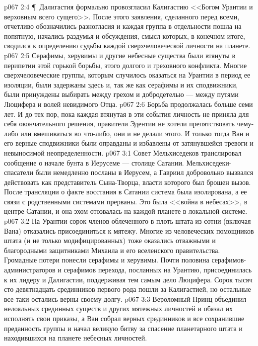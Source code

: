 \vs p067 2:4 \P\ Далигастия формально провозгласил Калигастию <<Богом Урантии и верховным всего сущего>>. После этого заявления, сделанного перед всеми, отчетливо обозначились разногласия и каждая группа в отдельности пошла на попятную, начались раздумья и обсуждения, смысл которых, в конечном итоге, сводился к определению судьбы каждой сверхчеловеческой личности на планете.
\vs p067 2:5 Серафимы, херувимы и другие небесные существа были втянуты в перипетии этой горькой борьбы, этого долгого и греховного конфликта. Многие сверхчеловеческие группы, которым случилось оказаться на Урантии в период ее изоляции, были задержаны здесь и, так же как серафимы и их сподвижники, были принуждены выбирать между грехом и добродетелью --- между путями Люцифера и волей невидимого Отца.
\vs p067 2:6 Борьба продолжалась больше семи лет. И до тех пор, пока каждая втянутая в эти события личность не приняла для себя окончательного решения, правители Эдентии не хотели препятствовать чему\hyp{}либо или вмешиваться во что\hyp{}либо, они и не делали этого. И только тогда Ван и его верные сподвижники были оправданы и избавлены от затянувшейся тревоги и невыносимой неопределенности.
\vs p067 3:1 Совет Мельхиседеков транслировал сообщение о начале бунта в Иерусеме --- столице Сатании. Мельхиседеки\hyp{}спасатели были немедленно посланы в Иерусем, а Гавриил добровольно вызвался действовать как представитель Сына\hyp{}Творца, власти которого был брошен вызов. После трансляции о факте восстания в Сатании система была изолирована, а ее связи с родственными системами прерваны. Это была <<война в небесах>>, в центре Сатании, и она эхом отозвалась на каждой планете в локальной системе.
\vs p067 3:2 На Урантии сорок членов облеченного в плоть штата из сотни (включая Вана) отказались присоединиться к мятежу. Многие из человеческих помощников штата (и не только модифицированных) тоже оказались отважными и благородными защитниками Михаила и его вселенского правительства. Громадные потери понесли серафимы и херувимы. Почти половина серафимов\hyp{}администраторов и серафимов перехода, посланных на Урантию, присоединилась к их лидеру и Далигастии, поддерживая тем самым дело Люцифера. Сорок тысяч сто девятнадцать срединников первого рода пошли за Калигастией, но остальные все\hyp{}таки остались верны своему долгу.
\vs p067 3:3 Вероломный Принц объединил нелояльных срединных существ и других мятежных личностей и обязал их исполнять свои приказы, а Ван собрал верных срединников и все сохранившие преданность группы и начал великую битву за спасение планетарного штата и находившихся на планете небесных личностей.
